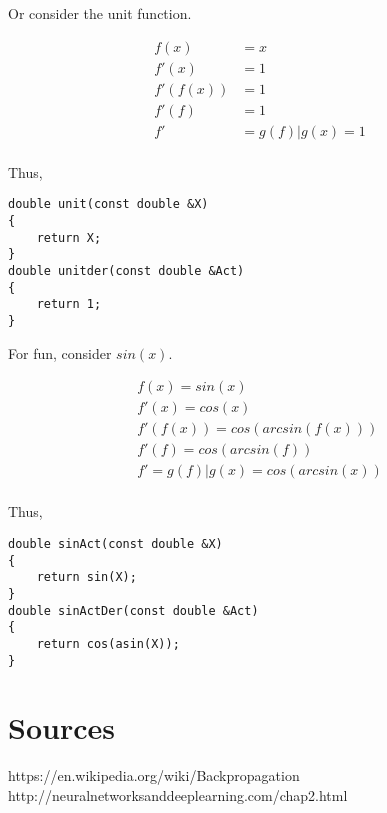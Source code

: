 \documentclass[8pt]{amsart}
\begin{document}
Or consider the unit function.

\[
    \begin{aligned}
        f(x) &= x \\
        f'(x) &= 1 \\
        f'(f(x)) &= 1 \\
        f'(f) &= 1 \\
        f' &= g(f) | g(x) = 1 \\
    \end{aligned}
\]

Thus,

\begin{verbatim}
double unit(const double &X)
{
    return X;
}
double unitder(const double &Act)
{
    return 1;
}
\end{verbatim}

For fun, consider $sin(x)$.

\[
    \begin{aligned}
        f(x) = sin(x) \\
        f'(x) = cos(x) \\
        f'(f(x)) = cos(arcsin(f(x))) \\
        f'(f) = cos(arcsin(f)) \\
        f' = g(f) | g(x) = cos(arcsin(x)) \\
    \end{aligned}
\]

Thus,

\begin{verbatim}
double sinAct(const double &X)
{
    return sin(X);
}
double sinActDer(const double &Act)
{
    return cos(asin(X));
}
\end{verbatim}

\section{Sources}

https://en.wikipedia.org/wiki/Backpropagation \\
http://neuralnetworksanddeeplearning.com/chap2.html
\end{document}
